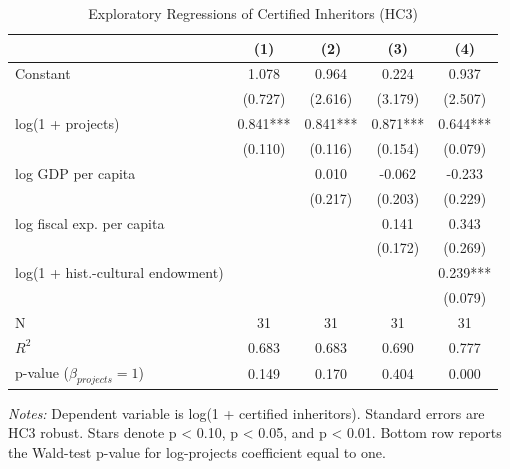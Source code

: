 \begin{table}[!htbp]
\centering
\caption{Exploratory Regressions of Certified Inheritors (HC3)}
\label{tab:reg_log_inheritors}
\small
\begin{tabular}{lcccc}
\toprule
 & (1) & (2) & (3) & (4) \\
\midrule
Constant & 1.078 & 0.964 & 0.224 & 0.937 \\
 & (0.727) & (2.616) & (3.179) & (2.507) \\
log(1 + projects) & 0.841*** & 0.841*** & 0.871*** & 0.644*** \\
 & (0.110) & (0.116) & (0.154) & (0.079) \\
log GDP per capita &  & 0.010 & -0.062 & -0.233 \\
 &  & (0.217) & (0.203) & (0.229) \\
log fiscal exp. per capita &  &  & 0.141 & 0.343 \\
 &  &  & (0.172) & (0.269) \\
log(1 + hist.-cultural endowment) &  &  &  & 0.239*** \\
 &  &  &  & (0.079) \\
\midrule
N & 31 & 31 & 31 & 31 \\
$R^2$ & 0.683 & 0.683 & 0.690 & 0.777 \\
p-value ($\beta_{projects}=1$) & 0.149 & 0.170 & 0.404 & 0.000 \\
\bottomrule
\end{tabular}
\begin{minipage}{0.95\textwidth}\footnotesize \textit{Notes:} Dependent variable is log(1 + certified inheritors). Standard errors are HC3 robust. Stars denote p < 0.10, p < 0.05, and p < 0.01. Bottom row reports the Wald-test p-value for log-projects coefficient equal to one.\end{minipage}
\end{table}
